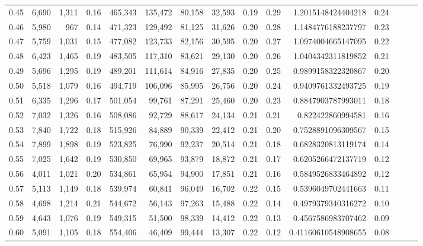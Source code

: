 \begin{tabular}{rrrrrrrrrrrrrrr}
0.45 &   6,690 &  1,311 &  0.16 &  465,343 &  135,472 &   80,158 &   32,593 &  0.19 &  0.29 &    1.2015148424404218 &      0.24 \\
0.46 &   5,980 &    967 &  0.14 &  471,323 &  129,492 &   81,125 &   31,626 &  0.20 &  0.28 &    1.1484776188237797 &      0.23 \\
0.47 &   5,759 &  1,031 &  0.15 &  477,082 &  123,733 &   82,156 &   30,595 &  0.20 &  0.27 &    1.0974004665147095 &      0.22 \\
0.48 &   6,423 &  1,465 &  0.19 &  483,505 &  117,310 &   83,621 &   29,130 &  0.20 &  0.26 &    1.0404342311819852 &      0.21 \\
0.49 &   5,696 &  1,295 &  0.19 &  489,201 &  111,614 &   84,916 &   27,835 &  0.20 &  0.25 &    0.9899158322320867 &      0.20 \\
0.50 &   5,518 &  1,079 &  0.16 &  494,719 &  106,096 &   85,995 &   26,756 &  0.20 &  0.24 &    0.9409761332493725 &      0.19 \\
0.51 &   6,335 &  1,296 &  0.17 &  501,054 &   99,761 &   87,291 &   25,460 &  0.20 &  0.23 &    0.8847903787993011 &      0.18 \\
0.52 &   7,032 &  1,326 &  0.16 &  508,086 &   92,729 &   88,617 &   24,134 &  0.21 &  0.21 &     0.822422860994581 &      0.16 \\
0.53 &   7,840 &  1,722 &  0.18 &  515,926 &   84,889 &   90,339 &   22,412 &  0.21 &  0.20 &    0.7528891096309567 &      0.15 \\
0.54 &   7,899 &  1,898 &  0.19 &  523,825 &   76,990 &   92,237 &   20,514 &  0.21 &  0.18 &    0.6828320813119174 &      0.14 \\
0.55 &   7,025 &  1,642 &  0.19 &  530,850 &   69,965 &   93,879 &   18,872 &  0.21 &  0.17 &    0.6205266472137719 &      0.12 \\
0.56 &   4,011 &  1,021 &  0.20 &  534,861 &   65,954 &   94,900 &   17,851 &  0.21 &  0.16 &    0.5849526833464892 &      0.12 \\
0.57 &   5,113 &  1,149 &  0.18 &  539,974 &   60,841 &   96,049 &   16,702 &  0.22 &  0.15 &    0.5396049702441663 &      0.11 \\
0.58 &   4,698 &  1,214 &  0.21 &  544,672 &   56,143 &   97,263 &   15,488 &  0.22 &  0.14 &    0.4979379340316272 &      0.10 \\
0.59 &   4,643 &  1,076 &  0.19 &  549,315 &   51,500 &   98,339 &   14,412 &  0.22 &  0.13 &    0.4567586983707462 &      0.09 \\
0.60 &   5,091 &  1,105 &  0.18 &  554,406 &   46,409 &   99,444 &   13,307 &  0.22 &  0.12 &   0.41160610548908655 &      0.08 \\

\end{tabular}
